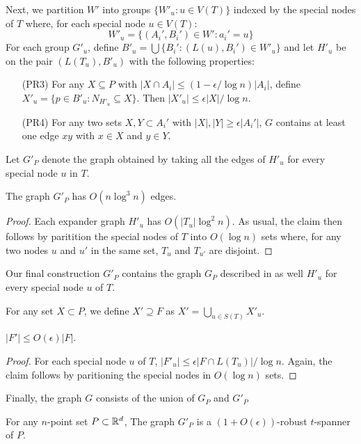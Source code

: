 \documentclass{patmorin}
\begin{document}
Next, we partition $W'$ into groups $\{W'_u: u\in V(T)\}$ indexed by
the special nodes of $T$ where, for each special node $u\in V(T)$:
\[
	W'_u = \{ (A_i',B_i')\in W' : a_i' = u \}
\]
For each group $G'_u$, define $B'_u=\bigcup\{B_i' : (L(u),B_i')\in
W'_u\}$ and let $H'_u$ be on the pair $(L(T_u), B'_u)$ with the following
properties: 
\begin{enumerate}
  \item[(PR3)] For any $X\subseteq P$ with $|X\cap A_i|\le
  (1-\epsilon/\log n)|A_i|$, define $X'_u = \{p\in B'_u: N_{H'_u}\subseteq
  X\}$.  Then $|X'_u|\le \epsilon|X|/\log n$.

  \item[(PR4)] For any two sets $X,Y\subset A_i'$ with $|X|,|Y|\ge
  \epsilon|A_i'|$, $G$ contains at least one edge $xy$ with $x\in X$
  and $y\in Y$.
\end{enumerate}

Let $G'_P$ denote the graph obtained by taking all the edges of $H'_u$ for every special node $u$ in $T$.

\begin{clm}
  The graph $G'_P$ has $O(n\log^3 n)$ edges.
\end{clm}

\begin{proof}
  Each expander graph $H'_u$ has $O(|T_u|\log^2 n)$.  As usual, the claim
  then follows by paritition the special nodes of $T$ into $O(\log n)$
  sets where, for any two nodes $u$ and $u'$ in the same set, $T_u$ and
  $T_{u'}$ are disjoint.
\end{proof}

Our final construction $G'_P$ contains the graph $G_P$ described in
 as well $H'_u$ for every special node $u$ of $T$.

For any set $X\subset P$, we define $X'\supseteq F$ as 
$X' = \bigcup_{u\in S(T)} X'_u$.

\begin{clm}
  $|F'| \le O(\epsilon)|F|$.
\end{clm}

\begin{proof}
  For each special node $u$ of $T$, $|F'_u|\le \epsilon|F\cap L(T_u)|/\log
  n$.  Again, the claim follows by paritioning the special nodes in
  $O(\log n)$ sets.
\end{proof}

Finally, the graph $G$ consists of the union of $G_P$ and $G'_P$


\begin{clm}
  For any $n$-point set $P\subset\mathbb{R}^d$, The graph $G'_P$  is a
  $(1+O(\epsilon))$-robust $t$-spanner of $P$.
\end{clm}
\end{document}
